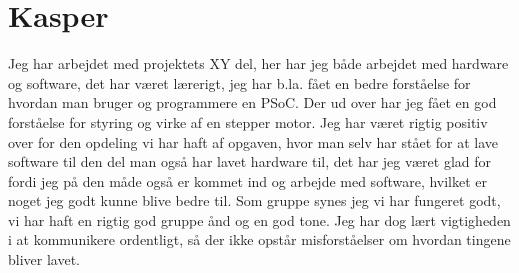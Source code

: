 \section{Kasper}

Jeg har arbejdet med projektets XY del, her har jeg både arbejdet med hardware og software, det har været lærerigt, jeg har b.la. fået en bedre forståelse for hvordan man bruger og programmere en PSoC. Der ud over har jeg fået en god forståelse for styring og virke af en stepper motor. Jeg har været rigtig positiv over for den opdeling vi har haft af opgaven, hvor man selv har stået for at lave software til den del man også har lavet hardware til, det har jeg været glad for fordi jeg på den måde også er kommet ind og arbejde med software, hvilket er noget jeg godt kunne blive bedre til. Som gruppe synes jeg vi har fungeret godt, vi har haft en rigtig god gruppe ånd og en god tone. Jeg har dog lært vigtigheden i at kommunikere ordentligt, så der ikke opstår misforståelser om hvordan tingene bliver lavet. 